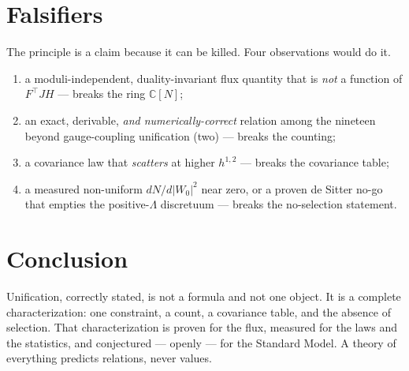 \documentclass[11pt]{article}
\newcommand{\flux}{F}
\newcommand{\hh}{H}
\begin{document}
\section{Falsifiers}

The principle is a claim because it can be killed. Four observations would do it.

\begin{enumerate}
\item a moduli-independent, duality-invariant flux quantity that is \emph{not} a function of
$\flux^\top J\hh$ --- breaks the ring $\mathbb{C}[N]$;
\item an exact, derivable, \emph{and numerically-correct} relation among the nineteen beyond
gauge-coupling unification (two) --- breaks the counting;
\item a covariance law that \emph{scatters} at higher $h^{1,2}$ --- breaks the covariance table;
\item a measured non-uniform $dN/d|W_0|^2$ near zero, or a proven de Sitter no-go that empties the
positive-$\Lambda$ discretuum --- breaks the no-selection statement.
\end{enumerate}

\section{Conclusion}

Unification, correctly stated, is not a formula and not one object. It is a complete
characterization: one constraint, a count, a covariance table, and the absence of selection.
That characterization is proven for the flux, measured for the laws and the statistics, and
conjectured --- openly --- for the Standard Model. A theory of everything predicts relations,
never values.
\end{document}
